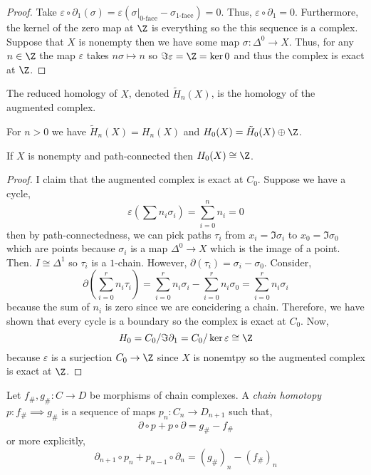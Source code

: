 \documentclass[12pt]{extarticle}
\begin{document}
\begin{proof}
Take $\varepsilon \circ \partial_1(\sigma) = \varepsilon(\sigma|_{\text{0-face}} - \sigma_{\text{1-face}}) = 0$. Thus, $\varepsilon \circ \partial_1 = 0$. Furthermore, the kernel of the zero map at $\Z$ is everything so the this sequence is a complex. \bigskip\\
Suppose that $X$ is nonempty then we have some map $\sigma : \Delta^0 \to X$. Thus, for any $n \in \Z$ the map $\varepsilon$ takes $n \sigma \mapsto n$ so $\Im{\varepsilon} = \Z = \ker{0}$ and thus the complex is exact at $\Z$. 
\end{proof}


\begin{definition}
The reduced homology of $X$, denoted $\tilde{H}_n(X)$, is the homology of the augmented complex.
\end{definition}

\begin{proposition}
For $n > 0$ we have $\tilde{H}_n(X) = H_n(X)$ and $H_0(X) = \tilde{H}_0(X) \oplus \Z$. 
\end{proposition}


\begin{proposition}
If $X$ is nonempty and path-connected then $H_0(X) \cong \Z$.
\end{proposition}

\begin{proof}
I claim that the augmented complex is exact at $C_0$. Suppose we have a cycle,
\[\varepsilon \left(\sum n_i \sigma_i \right) = \sum_{i = 0}^n n_i =  0\]
then by path-connectedness, we can pick paths $\tau_i$ from $x_i = \Im{\sigma_i}$ to $x_0 = \Im{\sigma_0}$ which are points because $\sigma_i$ is a map $\Delta^0 \to X$ which is the image of a point. Then. $I \cong \Delta^1$ so $\tau_i$ is a $1$-chain. However, $\partial(\tau_i) = \sigma_i - \sigma_0$. Consider,
\[ \partial \left(\sum_{i = 0}^r n_i \tau_i \right) = \sum_{i = 0}^r n_i \sigma_i - \sum_{i = 0}^r n_i \sigma_0 =  \sum_{i = 0}^r n_i \sigma_i\]
because the sum of $n_i$ is zero since we are concidering a chain. Therefore, we have shown that every cycle is a boundary so the complex is exact at $C_0$. Now, 
\[H_0 = C_0 / \Im{\partial_1} = C_0 / \ker{\varepsilon} \cong \Z\]
because $\varepsilon$ is a surjection $C_0 \to \Z$ since $X$ is nonemtpy so the augmented complex is exact at $\Z$.  
\end{proof}

\begin{definition}
Let $f_{\#}, g_{\#} : C \to D$ be morphisms of chain complexes. A \textit{chain homotopy} $p : f_{\#} \implies g_{\#}$ is a sequence of maps $p_n : C_n \to D_{n+1}$ such that, 
\[\partial \circ p + p \circ \partial = g_{\#} - f_{\#}\]
or more explicitly,
\[ 
\partial_{n+1} \circ p_n + p_{n-1} \circ \partial_{n} = (g_{\#})_n - (f_{\#})_n\] 
\end{definition}
\end{document}
